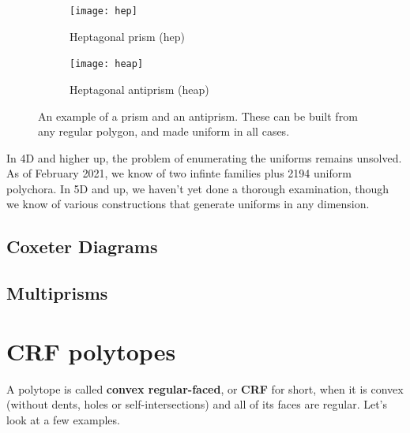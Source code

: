 \documentclass{article}
\begin{document}
\begin{figure}[H]
\centering
\begin{subfigure}{.5\textwidth}
  \centering
  \texttt{[image: hep]}
  \caption{Heptagonal prism (hep)}
  \label{fig:hep}
\end{subfigure}%
\begin{subfigure}{.5\textwidth}
  \centering
  \texttt{[image: heap]}
  \caption{Heptagonal antiprism (heap)}
  \label{fig:heap}
\end{subfigure}%
\caption{An example of a prism and an antiprism. These can be built from any regular polygon, and made uniform in all cases.}
\label{fig:prisms}
\end{figure}

In 4D and higher up, the problem of enumerating the uniforms remains unsolved. As of February 2021, we know of two infinte families plus 2194 uniform polychora. In 5D and up, we haven't yet done a thorough examination, though we know of various constructions that generate uniforms in any dimension.

\subsection{Coxeter Diagrams}


\subsection{Multiprisms}

\section{CRF polytopes}
A polytope is called \textbf{convex regular-faced}, or \textbf{CRF} for short, when it is convex (without dents, holes or self-intersections) and all of its faces are regular. Let's look at a few examples.
\end{document}
